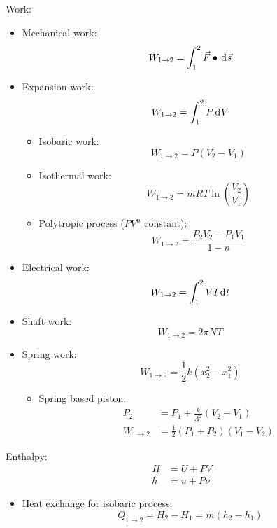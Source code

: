 \documentclass[10pt, twocolumn]{article}
\begin{document}
Work:
\begin{itemize}
  \item Mechanical work:
        \[
          W_{1 \rightarrow 2} = \int_1 ^2 {\vec{F} \bullet \,\mathrm{d}^{} \vec{s}}
        \]
  \item Expansion work:
        \[
          W_{1 \rightarrow 2} = \int_1 ^2 {P \,\mathrm{d}^{} V}
        \]
        \begin{itemize}
          \item Isobaric work:
                \[
                  W_{1 \rightarrow 2} = P\left( V_2 - V_1 \right)
                \]
          \item Isothermal work:
                \[
                  W_{1 \rightarrow 2} = mRT\ln\left( \frac{V_2 }{V_1 } \right)
                \]
          \item Polytropic process (\(PV^n \) constant):
                \[
                  W_{1 \rightarrow 2} = \frac{P_2 V_2 - P_1 V_1 }{1 - n}
                \]
        \end{itemize}
  \item Electrical work:
        \[
          W_{1 \rightarrow 2} = \int_1 ^2 {VI \,\mathrm{d}^{} t}
        \]
  \item Shaft work:
        \[
          W_{1 \rightarrow 2} = 2\pi NT
        \]
  \item Spring work:
        \[
          W_{1 \rightarrow 2} = \frac{1}{2}k\left( x_2 ^2 - x_1 ^2 \right)
        \]
        \begin{itemize}
          \item Spring based piston:
                \begin{align*}
                  P_2                 & = P_1 + \frac{k}{A^2 }\left( V_2 - V_1 \right)                 \\
                  W_{1 \rightarrow 2} & = \frac{1}{2}\left( P_1 + P_2 \right)\left( V_1 - V_2 \right)
                \end{align*}
        \end{itemize}
\end{itemize}

Enthalpy:
\begin{align*}
  H & = U + PV   \\
  h & = u + P\nu
\end{align*}
\begin{itemize}
  \item Heat exchange for isobaric process:
        \[
          Q_{1 \rightarrow 2} = H_2 - H_1 = m\left( h_2 - h_1 \right)
        \]
\end{itemize}
\end{document}
